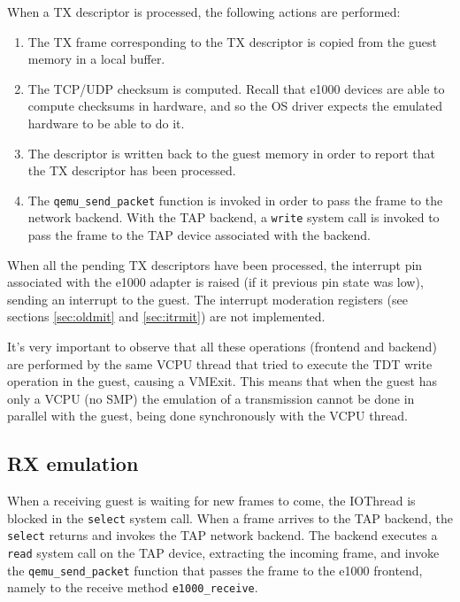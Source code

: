 When a TX descriptor is processed, the following actions are performed:
\begin{enumerate}
    \item The TX frame corresponding to the TX descriptor is copied from the guest memory in a local buffer.
    \item The TCP/UDP checksum is computed. Recall that e1000 devices are able to compute checksums in hardware, and so the OS 
	  driver expects the emulated hardware to be able to do it.
    \item The descriptor is written back to the guest memory in order to report that the TX descriptor has been processed.
    \item The \texttt{qemu\_send\_packet} function is invoked in order to pass the frame to the network backend. With the TAP backend,
	  a \texttt{write} system call is invoked to pass the frame to the TAP device associated with the backend.
\end{enumerate}

When all the pending TX descriptors have been processed, the interrupt pin associated with the e1000 adapter is raised (if it previous
pin state was low), sending an interrupt to the guest. The interrupt moderation registers (see sections \ref{sec:oldmit} and 
\ref{sec:itrmit}) are not implemented.

\vspace{0.5cm}

It's very important to observe that all these operations (frontend and backend) are performed by the same VCPU thread that tried to 
execute the TDT write operation in the guest, causing a VMExit.
This means that when the guest has only a VCPU (no SMP) the emulation of a transmission cannot be done in parallel with the guest, being
done synchronously with the VCPU thread.



\subsection{RX emulation}
\label{sec:e1000rxemu}
When a receiving guest is waiting for new frames to come, the IOThread is blocked in the \texttt{select} system call.
When a frame arrives to the TAP backend, the \texttt{select} returns and invokes the TAP network backend.
The backend executes a \texttt{read} system call on the TAP device, extracting the incoming frame, and invoke the \texttt{qemu\_send\_packet}
function that passes the frame to the e1000 frontend, namely to the receive method \texttt{e1000\_receive}.

